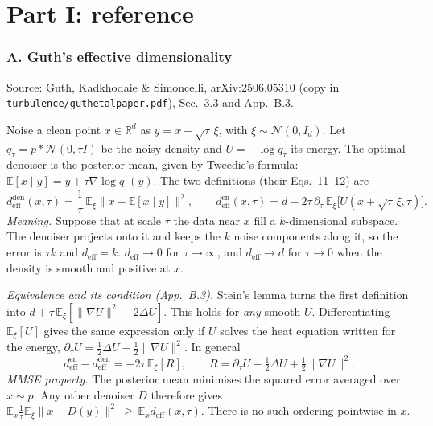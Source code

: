\documentclass[11pt]{article}
\newcommand{\E}{\mathbb{E}}
\newcommand{\code}[1]{\texttt{#1}}
\renewcommand{\_}{\origunderscore\allowbreak}
\newcommand{\deff}{d_{\mathrm{eff}}}
\begin{document}
\part*{Part I: reference}

\section{A. Guth's effective dimensionality}
\label{sec:A}

Source: Guth, Kadkhodaie \& Simoncelli, arXiv:2506.05310 (copy in
\code{turbulence/guth\_et\_al\_paper.pdf}), Sec.~3.3 and App.~B.3.

Noise a clean point $x\in\mathbb R^d$ as $y=x+\sqrt\tau\,\xi$, with
$\xi\sim\mathcal N(0,I_d)$. Let $q_\tau=p*\mathcal N(0,\tau I)$ be the noisy
density and $U=-\log q_\tau$ its energy. The optimal denoiser is the posterior
mean, given by Tweedie's formula:
$\E[x\mid y]=y+\tau\nabla\log q_\tau(y)$. The two definitions (their Eqs.~11--12) are
\begin{equation}
  \deff^{\mathrm{den}}(x,\tau)=\frac1\tau\,\E_\xi\big\lVert x-\E[x\mid y]\big\rVert^2,
  \qquad
  \deff^{\mathrm{en}}(x,\tau)=d-2\tau\,\partial_\tau\,\E_\xi\big[U(x+\sqrt\tau\,\xi,\tau)\big].
  \label{eq:A-def}
\end{equation}
\emph{Meaning.} Suppose that at scale $\tau$ the data near $x$ fill a
$k$-dimensional subspace. The denoiser projects onto it and keeps the $k$
noise components along it, so the error is $\tau k$ and $\deff=k$.
$\deff\to0$ for $\tau\to\infty$, and $\deff\to d$ for $\tau\to0$ when the
density is smooth and positive at $x$.

\emph{Equivalence and its condition (App.~B.3).} Stein's lemma turns the
first definition into $d+\tau\,\E_\xi[\lVert\nabla U\rVert^2-2\Delta U]$.
This holds for \emph{any} smooth $U$. Differentiating $\E_\xi[U]$ gives the
same expression only if $U$ solves the heat equation written for the energy,
$\partial_\tau U=\tfrac12\Delta U-\tfrac12\lVert\nabla U\rVert^2$. In general
\begin{equation}
  \deff^{\mathrm{en}}-\deff^{\mathrm{den}}=-2\tau\,\E_\xi[R],\qquad
  R=\partial_\tau U-\tfrac12\Delta U+\tfrac12\lVert\nabla U\rVert^2 .
  \label{eq:A-gap}
\end{equation}
\emph{MMSE property.} The posterior mean minimises the squared error
averaged over $x\sim p$. Any other denoiser $D$ therefore gives
$\E_x\tfrac1\tau\E_\xi\lVert x-D(y)\rVert^2\ \ge\ \E_x\deff(x,\tau)$.
There is no such ordering pointwise in $x$.
\end{document}
